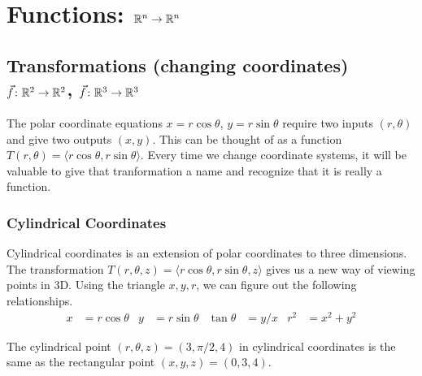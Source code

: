 \section{Functions: $\mathbb{R}^n\to \mathbb{R}^n$}

\subsection{Transformations (changing coordinates)\\ {$\vec f\colon \mathbb{R}^2\to \mathbb{R}^2$}, {$\vec f\colon \mathbb{R}^3\to \mathbb{R}^3$}}

The polar coordinate equations $x=r\cos\theta$, $y=r\sin\theta$
require two inputs $(r,\theta)$ and give two outputs $(x,y)$.  This can
be thought of as a function $T(r,\theta)=\langle
r\cos\theta,r\sin\theta\rangle$. Every time we change coordinate
systems, it will be valuable to give that tranformation a name and
recognize that it is really a function.


\subsubsection{Cylindrical Coordinates}
Cylindrical coordinates is an extension of polar coordinates to three
dimensions.  The transformation $T(r,\theta,z) = \langle
r\cos\theta,r\sin\theta,z\rangle$ gives us a new way of viewing points
in 3D.  Using the triangle $x,y,r$, we can figure out the following
relationships.
\begin{align*}
  x&=r \cos \theta & 
  y&=r \sin \theta & 
  \tan\theta&=y/x & 
  r^2&=x^2+y^2     
\end{align*}

\begin{example}
The cylindrical point {$(r, \theta, z)=(3,\pi/2,4)$} in
cylindrical coordinates is the same as the rectangular point $(x,y,z)
= (0,3,4)$.
\end{example}

